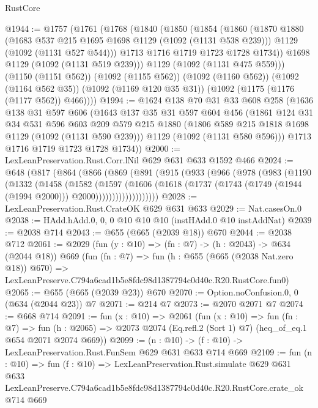 \begin{lexlean}{RustCore}
\begin{coremodule}
@1944 := @1757
    (@1761
      (@1768
        (@1840
          (@1850
            (@1854
              (@1860
                (@1870
                  @1880
                  (@1683 @537 @215 @1695 @1698 @1129 (@1092 (@1131 @538 @239)))
                  @1129
                  (@1092 (@1131 @527 @544)))
                @1713
                @1716
                @1719
                @1723
                @1728
                @1734))
            @1698
            @1129
            (@1092 (@1131 @519 @239)))
          @1129
          (@1092 (@1131 @475 @559)))
        (@1150 (@1151 @562))
        (@1092 (@1155 @562))
        (@1092 (@1160 @562))
        (@1092 (@1164 @562 @35))
        (@1092 (@1169 @120 @35 @31))
        (@1092 (@1175 (@1176 (@1177 @562)) @466))))
@1994 := @1624
    @138
    @70
    @31
    @33
    @608
    @258
    (@1636
      @138
      @31
      @597
      @606
      (@1643
        @137
        @35
        @31
        @597
        @604
        @456
        (@1861
          @124
          @31
          @34
          @531
          @596
          @603
          @209
          @579
          @215
          @1880
          (@1806 @589 @215 @1818 @1698 @1129 (@1092 (@1131 @590 @239)))
          @1129
          (@1092 (@1131 @580 @596)))
        @1713
        @1716
        @1719
        @1723
        @1728
        @1734))
@2000 := LexLeanPreservation.Rust.Corr.lNil @629 @631 @633 @1592 @466
@2024 := @648
    (@817
      (@864
        (@866
          (@869
            (@891
              (@915
                (@933
                  (@966
                    (@978
                      (@983
                        (@1190
                          (@1332
                            (@1458
                              (@1582
                                (@1597
                                  (@1606
                                    (@1618
                                      (@1737
                                        (@1743
                                          (@1749 (@1944 (@1994 @2000)))
                                          @2000)))))))))))))))))))
@2028 := LexLeanPreservation.Rust.CrateOK @629 @631 @633
@2029 := Nat.casesOn.{0}
@2038 := HAdd.hAdd.{0, 0, 0} @10 @10 @10 (instHAdd.{0} @10 instAddNat)
@2039 := @2038 @714
@2043 := @655 (@665 (@2039 @18)) @670
@2044 := @2038 @712
@2061 := @2029
    (fun (y : @10) => (fn : @7) -> (h : @2043) -> @634 (@2044 @18))
    @669
    (fun (fn : @7) =>
    fun (h : @655 (@665 (@2038 Nat.zero @18)) @670) =>
    LexLeanPreserve.C794a6cad1b5e8fdc98d1387794c0d40c.R20.RustCore.fun0)
@2065 := @655 (@665 (@2039 @23)) @670
@2070 := Option.noConfusion.{0, 0} (@634 (@2044 @23)) @7
@2071 := @214 @7
@2073 := @2070 @2071 @7
@2074 := @668 @714
@2091 := fun (x : @10) =>
  @2061
    (fun (x : @10) =>
    fun (fn : @7) =>
    fun (h : @2065) => @2073 @2074 (Eq.refl.{2} (Sort 1) @7) (heq_of_eq.{1} @654 @2071 @2074 @669))
@2099 := (n : @10) -> (f : @10) -> LexLeanPreservation.Rust.FunSem @629 @631 @633 @714 @669
@2109 := fun (n : @10) =>
  fun (f : @10) =>
  LexLeanPreservation.Rust.simulate
    @629
    @631
    @633
    LexLeanPreserve.C794a6cad1b5e8fdc98d1387794c0d40c.R20.RustCore.crate_ok
    @714
    @669
\end{coremodule}
\end{lexlean}

